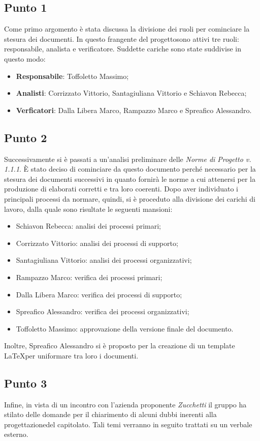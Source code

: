     \subsection{Punto 1}
        Come primo argomento è stata discussa la divisione dei ruoli per cominciare la stesura dei documenti. In questo frangente del progetto\glosp sono attivi tre ruoli: responsabile, analista e verificatore. Suddette cariche sono state suddivise in questo modo:
        \begin{itemize}
            \item \textbf{Responsabile}: Toffoletto Massimo;
            \item \textbf{Analisti}: Corrizzato Vittorio, Santagiuliana Vittorio e Schiavon Rebecca;
            \item \textbf{Verficatori}: Dalla Libera Marco, Rampazzo Marco e Spreafico Alessandro. 
        \end{itemize}
    \subsection{Punto 2}
        Successivamente si è passati a un'analisi preliminare delle \textit{Norme di Progetto v. 1.1.1}. È stato deciso di cominciare da questo documento perché necessario per la stesura dei documenti successivi in quanto fornirà le norme a cui attenersi per la produzione di elaborati corretti e tra loro coerenti. Dopo aver individuato i principali processi da normare, quindi, si è proceduto alla divisione dei carichi di lavoro, dalla quale sono risultate le seguenti mansioni:
        \begin{itemize}
            \item Schiavon Rebecca: analisi dei processi primari;
            \item Corrizzato Vittorio: analisi dei processi di supporto;
            \item Santagiuliana Vittorio: analisi dei processi organizzativi;
            \item Rampazzo Marco: verifica dei processi primari;
            \item Dalla Libera Marco: verifica dei processi di supporto;
            \item Spreafico Alessandro: verifica dei processi organizzativi;
            \item Toffoletto Massimo: approvazione della versione finale del documento.
        \end{itemize}
        Inoltre, Spreafico Alessandro si è proposto per la creazione di un template \LaTeX per uniformare tra loro i documenti.
    \subsection{Punto 3}
    Infine, in vista di un incontro con l'azienda proponente \textit{Zucchetti} il gruppo ha stilato delle domande per il chiarimento di alcuni dubbi inerenti alla progettazione\glosp del capitolato\glo. Tali temi verranno in seguito trattati su un verbale esterno.